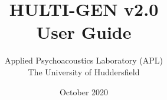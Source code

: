 \documentclass[oneside, a4paper,12pt]{book}
\begin{document}
\author{Applied Psychoacoustics Laboratory (APL) \\ The University of Huddersfield}
\title{HULTI-GEN v2.0 \\ User Guide}
\date{October 2020}

\maketitle
\cleardoublepage
\tableofcontents






\end{document}
